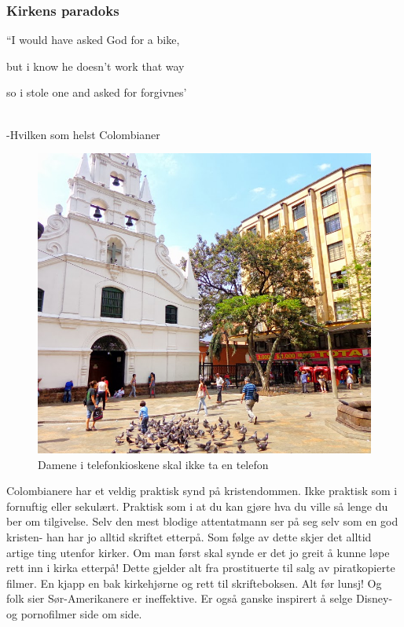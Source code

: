 \subsubsection{Kirkens paradoks}

\begin{dialogue}
	\item ``I would have asked God for a bike,
	\item but i know he doesn't work that way
	\item so i stole one and asked for forgivnes'
\end{dialogue}\\ -Hvilken som helst Colombianer

\begin{figure}[!h]
	\centering
\includegraphics[width=\textwidth]{workinghard}
	\caption*{Damene i telefonkioskene skal ikke ta en telefon}
\label{fig:prosti}
\end{figure}
Colombianere har et veldig praktisk synd på kristendommen. Ikke
praktisk som i fornuftig eller sekulært. Praktisk som i at du kan gjøre
hva du ville så lenge du ber om tilgivelse. Selv den mest blodige
attentatmann ser på seg selv som en god kristen- han har jo
alltid skriftet etterpå. Som følge av dette skjer det alltid artige
ting utenfor kirker. Om man først skal synde er det jo greit å kunne
løpe rett inn i kirka etterpå! Dette gjelder alt fra prostituerte til
salg av  piratkopierte filmer. En kjapp en bak kirkehjørne og
rett til skrifteboksen. Alt før lunsj! Og folk sier Sør-Amerikanere er
ineffektive. Er også ganske inspirert å selge Disney- og pornofilmer
side om side.

